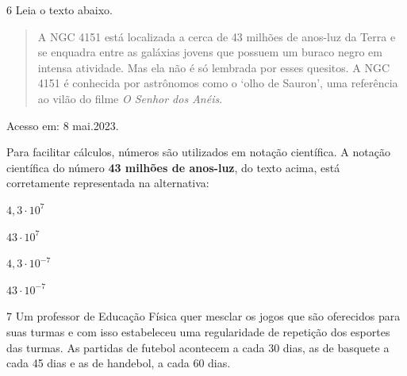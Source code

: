 {\begin{escolha}
{%

\num{6} Leia o texto abaixo.

\begin{quote}
A NGC 4151 está localizada a cerca de 43 milhões de anos-luz
da Terra e se enquadra entre as galáxias jovens que possuem um buraco
negro em intensa atividade. Mas ela não é só lembrada por esses
quesitos. A NGC 4151 é conhecida por astrônomos como o `olho de Sauron',
uma referência ao vilão do filme \textit{O Senhor dos Anéis}.
\end{quote}

Acesso em: 8 mai.2023.}

Para facilitar cálculos, números são utilizados em notação científica.
A notação científica do número \textbf{43 milhões de anos-luz}, do texto 
acima, está corretamente representada na alternativa:

\begin{escolha}

  \item $4,3 \cdot 10^7$

  \item $43 \cdot 10^7$

  \item $4,3 \cdot 10^{-7}$

  \item $43 \cdot 10^{-7}$

\end{escolha}


\num{7} Um professor de Educação Física quer mesclar os jogos que são
oferecidos para suas turmas e com isso estabeleceu uma regularidade de
repetição dos esportes das turmas. As partidas de futebol acontecem a 
cada 30 dias, as de basquete a cada 45 dias e as de handebol, a cada 60 dias.


\end{escolha}}
